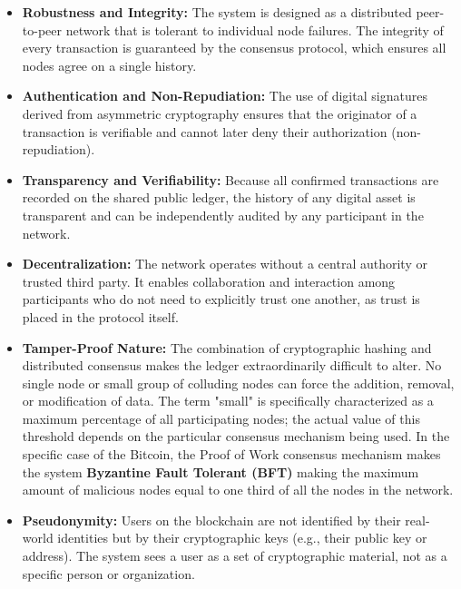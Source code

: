 \documentclass{scrbook}
\begin{document}
\begin{itemize}
    \item \textbf{Robustness and Integrity:} The system is designed as a distributed peer-to-peer network that is tolerant to individual node failures. The integrity of every transaction is guaranteed by the consensus protocol, which ensures all nodes agree on a single history.
    
    \item \textbf{Authentication and Non-Repudiation:} The use of digital signatures derived from asymmetric cryptography ensures that the originator of a transaction is verifiable and cannot later deny their authorization (non-repudiation).
    
    \item \textbf{Transparency and Verifiability:} Because all confirmed transactions are recorded on the shared public ledger, the history of any digital asset is transparent and can be independently audited by any participant in the network.
    
    \item \textbf{Decentralization:} The network operates without a central authority or trusted third party. It enables collaboration and interaction among participants who do not need to explicitly trust one another, as trust is placed in the protocol itself.
    
    \item \textbf{Tamper-Proof Nature:} The combination of cryptographic hashing and distributed consensus makes the ledger extraordinarily difficult to alter. No single node or small group of colluding nodes can force the addition, removal, or modification of data. The term "small" is specifically characterized as a maximum percentage of all participating nodes; the actual value of this threshold depends on the particular consensus mechanism being used. In the specific case of the Bitcoin, the Proof of Work consensus mechanism makes the system \textbf{Byzantine Fault Tolerant (BFT)} making the maximum amount of malicious nodes equal to one third of all the nodes in the network.
    
    \item \textbf{Pseudonymity:} Users on the blockchain are not identified by their real-world identities but by their cryptographic keys (e.g., their public key or address). The system sees a user as a set of cryptographic material, not as a specific person or organization.
\end{itemize}
\end{document}
